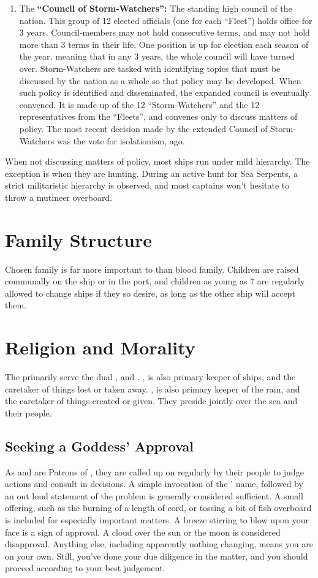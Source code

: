 \documentclass[blue]{GL2020}
\begin{document}
\begin{enumerate}
		\item The {\bf``Council of Storm-Watchers'':} The standing high council of the \pShip{} nation. This group of 12 elected officials (one for each ``Fleet'') holds office for 3 years. Council-members may not hold consecutive terms, and may not hold more than 3 terms in their life. One position is up for election each season of the year, meaning that in any 3 years, the whole council will have turned over. Storm-Watchers are tasked with identifying topics that must be discussed by the nation as a whole so that policy may be developed. When such policy is identified and disseminated, the expanded council is eventually convened. It is made up of the 12 ``Storm-Watchers'' and the 12 representatives from the ``Fleets'', and convenes only to discuss matters of policy. The most recent decision made by the extended Council of Storm-Watchers was the vote for isolationism, \pIsolation{} ago.
\end{enumerate}

When not discussing matters of policy, most ships run under mild hierarchy. The exception is when they are hunting. During an active hunt for Sea Serpents, a strict militaristic hierarchy is observed, and most captains won't hesitate to throw a mutineer overboard.

\section*{Family Structure}
Chosen family is far more important to \pShippies{} than blood family. Children are raised communally on the ship or in the port, and children as young as 7 are regularly allowed to change ships if they so desire, as long as the other ship will accept them.

\section*{Religion and Morality}
The \pShippies{} primarily serve the dual \cEbb{\God}, \cEbb{} and \cFlow{}. \cEbbFull{\MYname}, is also primary keeper of ships, and the caretaker of things lost or taken away. \cFlowFull{\MYname}, is also primary keeper of the rain, and the caretaker of things created or given. They preside jointly over the sea and their people.

\subsection*{Seeking a Goddess' Approval}
As \cEbb{} and \cFlow{} are Patrons of \pShip{}, they are called up on regularly by their people to judge actions and consult in decisions. A simple invocation of the \cEbb{\God}' name, followed by an out loud statement of the problem is generally considered sufficient. A small offering, such as the burning of a length of cord, or tossing a bit of fish overboard is included for especially important matters. A breeze stirring to blow upon your face is a sign of approval. A cloud over the sun or the moon is considered disapproval. Anything else, including apparently nothing changing, means you are on your own. Still, you've done your due diligence in the matter, and you should proceed according to your best judgement.
\end{document}
